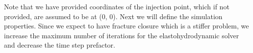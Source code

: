 \documentclass[letterpaper,10pt,english]{sphinxmanual}
\begin{document}
\begin{sphinxVerbatim}[commandchars=\\\{\}]
  \PYG{p}{[}\PYG{p}{[} \PYG{p}{]} \PYG{p}{[} \PYG{p}{]}\PYG{p}{]}
  
                                \PYG{p}{[} \PYG{p}{]}

  
\end{sphinxVerbatim}

\sphinxAtStartPar
Note that we have provided coordinates of the injection point, which if not provided, are assumed to be at (0, 0). Next we will define the simulation properties. Since we expect to have fracture closure which is a stiffer problem, we increase the maximum number of iterations for the elasto\sphinxhyphen{}hydrodynamic solver and decrease the time step pre\sphinxhyphen{}factor.
\end{document}
